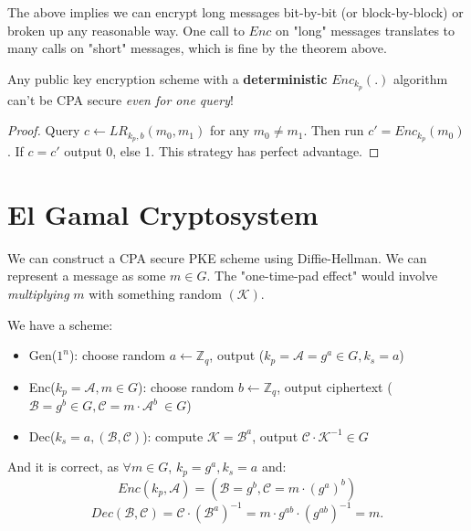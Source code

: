 
The above implies we can encrypt long messages bit-by-bit (or block-by-block) or broken up any reasonable way. One call to \(Enc\) on "long" messages translates to many calls on "short" messages, which is fine by the theorem above. \par

\begin{theorem}
  Any public key encryption scheme with a \textbf{deterministic} \(Enc_{k_p}(.)\) algorithm can't be CPA secure \emph{even for one query}!
\end{theorem}
\begin{proof}
  Query \(c \gets LR_{k_p, b}(m_0, m_1)\) for any \(m_0 \neq m_1\). Then run \(c'= Enc_{k_p}(m_0)\). If \(c=c'\) output 0, else 1. This strategy has perfect advantage.
\end{proof}

\section{El Gamal Cryptosystem}
We can construct a CPA secure PKE scheme using Diffie-Hellman. We can represent a message as some \(m \in G\). The "one-time-pad effect" would involve \emph{multiplying} \(m\) with something random \((\mathcal{K}) \).

\begin{definition}[El Gamal]
  We have a scheme:
  \begin{itemize}
    \item Gen(\(1^n\)): choose random \(a \gets \mathbb{Z}_q\), output (\(k_p = \mathcal{A} = g^a \in G, k_s=a\))
    \item Enc(\(k_p = \mathcal{A}, m \in G\)): choose random \(b \gets \mathbb{Z}_q\), output ciphertext (\(\mathcal{B} = g^b \in G, \mathcal{C} = m \cdot \mathcal{A}^b \ \in G\)) 
    \item Dec(\(k_s = a, (\mathcal{B}, \mathcal{C})\)): compute \(\mathcal{K} = \mathcal{B}^a\), output \(\mathcal{C} \cdot \mathcal{K}^{-1} \in G\) 
  \end{itemize}
  And it is correct, as \(\forall m \in G\), \(k_p = g^a, k_s = a\) and:
  \[
    Enc(k_p, \mathcal{A}) = (\mathcal{B}=g^b, \mathcal{C} = m \cdot (g^a)^b)
  \]
  \[
    Dec(\mathcal{B}, \mathcal{C})=\mathcal{C} \cdot (\mathcal{B}^a)^{-1} = m \cdot g^{ab} \cdot (g^{ab})^{-1} = m.
  \]
\end{definition}

